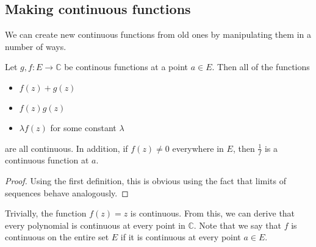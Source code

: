 \subsection{Making continuous functions}
We can create new continuous functions from old ones by manipulating them in a number of ways.
\begin{proposition}
	Let \(g, f \colon E \to \mathbb C\) be continous functions at a point \(a \in E\).
	Then all of the functions
	\begin{itemize}
		\item \(f(z) + g(z)\)
		\item \(f(z)g(z)\)
		\item \(\lambda f(z)\) for some constant \(\lambda\)
	\end{itemize}
	are all continuous.
	In addition, if \(f(z) \neq 0\) everywhere in \(E\), then \(\frac{1}{f}\) is a continuous function at \(a\).
\end{proposition}
\begin{proof}
	Using the first definition, this is obvious using the fact that limits of sequences behave analogously.
\end{proof}
\noindent Trivially, the function \(f(z) = z\) is continuous.
From this, we can derive that every polynomial is continuous at every point in \(\mathbb C\).
Note that we say that \(f\) is continuous on the entire set \(E\) if it is continuous at every point \(a \in E\).

